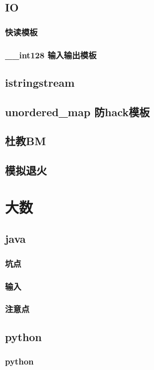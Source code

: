 \documentclass[10pt,a4paper]{article}
\begin{document}
\subsection{IO}
\subsubsection{快读模板}

\subsubsection{\_\_int128 输入输出模板}

\subsection{istringstream}

\subsection{unordered\_map 防hack模板}

\subsection{杜教BM}

\subsection{模拟退火}

\section{大数}
\subsection{java}
\subsubsection{坑点}

\subsubsection{输入}

\subsubsection{注意点}

\subsection{python}
\subsubsection{python}

\end{document}
